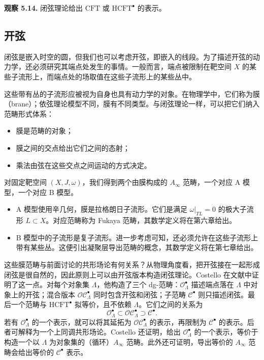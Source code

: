 \begin{note}\label{note:closed-strings-cft}
\textbf{观察 5.14.} 闭弦理论给出 $\mathrm{CFT}$ 或 $\mathrm{HCFT}^\bullet$ 的表示。
\end{note}

\subsection{开弦}
闭弦是嵌入时空的圆，但我们也可以考虑开弦，即嵌入的线段。为了描述开弦的动力学，还必须研究其端点处发生的事情。一般而言，端点被限制在靶空间 $X$ 的某些子流形上，而端点处的场取值在这些子流形上的某些丛中。

这些带有丛的子流形应被视为自身也具有动力学的对象。在物理学中，它们称为膜（brane）；依弦理论模型不同，膜有不同类型。与闭弦理论一样，可以把它们纳入范畴形式体系：
\begin{itemize}
  \item 膜是范畴的对象；
  \item 膜之间的交点给出它们之间的态射；
  \item 乘法由弦在这些交点之间运动的方式决定。
\end{itemize}
对固定靶空间 $(X,J,\omega)$，我们得到两个由膜构成的 $A_\infty$ 范畴，一个对应 A 模型，一个对应 B 模型。
\begin{itemize}
  \item A 模型使用辛几何，膜是拉格朗日子流形。它们是满足 $\omega|_{TL}=0$ 的极大子流形 $L\subset X$。对应范畴称为 Fukaya 范畴，其数学定义将在第六章给出。
  \item B 模型中的子流形是复子流形。进一步考虑可知，还必须允许在这些子流形上带有某些丛。这便引出凝聚层导出范畴的概念，其数学定义将在第七章给出。
\end{itemize}

这些膜范畴与前面讨论的共形场论有何关系？从物理角度看，把开弦接在一起形成闭弦是很自然的，因此原则上可以由开弦版本构造闭弦理论。Costello 在文献中证明了这一点。对每个对象集 $\Lambda$，他构造了三个 dg-范畴：$\mathcal O^\bullet_\Lambda$ 描述端点落在 $\Lambda$ 中对象上的开弦；混合版本 $\mathcal{OC}^\bullet_\Lambda$ 同时包含开弦和闭弦；子范畴 $\mathcal C^\bullet$ 则只描述闭弦。最后一个范畴与 $\mathrm{HCFT}^\bullet$ 拟等价，且不依赖 $\Lambda$。它们之间的关系为
\[
  \mathcal O^\bullet_\Lambda\subset
  \mathcal{OC}^\bullet_\Lambda\supset\mathcal C^\bullet.
\]
若有 $\mathcal O^\bullet_\Lambda$ 的一个表示，就可以将其延拓为 $\mathcal{OC}^\bullet_\Lambda$ 的表示，再限制为 $\mathcal C^\bullet$ 的表示。后者可解释为一个上同调共形场论。Costello 还证明，给出 $\mathcal O^\bullet_\Lambda$ 的一个表示，等价于构造一个以 $\Lambda$ 为对象集的（循环）$A_\infty$ 范畴。此外还可证明，导出等价的 $A_\infty$ 范畴会给出等价的 $\mathcal C^\bullet$ 表示。

